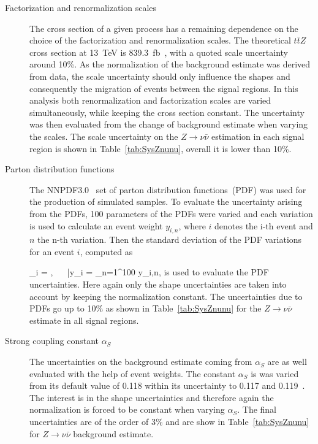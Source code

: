 \begin{description}
\item[Factorization and renormalization scales]
The cross section of a given process has a remaining dependence on the choice of the factorization and renormalization scales. The theoretical $t\bar{t}Z$ cross section at 13~TeV is 839.3~fb~\cite{deFlorian:2016spz}, with a quoted scale uncertainty around 10\%. As the normalization of the background estimate was derived from data, the scale uncertainty should only influence the shapes and consequently the migration of events between the signal regions. In this analysis both renormalization and factorization scales are varied simultaneously, while keeping the cross section constant. The uncertainty was then evaluated from the change of background estimate when varying the scales. The scale uncertainty on the $Z \to \nu \bar{\nu}$ estimation in each signal region is shown in Table~\ref{tab:SysZnunu}, overall it is lower than 10\%.


\item[Parton distribution functions]
The NNPDF3.0~\cite{Ball:2014uwa} set of parton distribution functions~(PDF) was used for the production of simulated samples. To evaluate the uncertainty arising from the PDFs, 100 parameters of the PDFs were varied and each variation is used to calculate an event weight $y_{i,n}$, where $i$ denotes the i-th event and $n$ the n-th variation. Then the standard deviation of the PDF variations for an event $i$, computed as

{
\sigma_{i} = , ~~ \bar{y}_{i} =  \sum_{n=1}^{100} y_{i,n},
}
is used to evaluate the PDF uncertainties. Here again only the shape uncertainties are taken into account by keeping the normalization constant. The uncertainties due to PDFs go up to 10\% as shown in Table~\ref{tab:SysZnunu} for the $Z \to \nu \bar{\nu}$ estimate in all signal regions.

\item[Strong coupling constant $\alpha_{S}$]
The uncertainties on the background estimate coming from $\alpha_{S}$ are as well evaluated with the help of event weights. The constant $\alpha_{S}$ is was varied from its default value of 0.118  within its uncertainty to 0.117 and 0.119~\cite{Patrignani:2016xqp}.  The interest is in the shape uncertainties and therefore again the normalization is forced to be constant when varying $\alpha_{S}$. The final uncertainties are of the order of 3\% and are show in Table~\ref{tab:SysZnunu} for $Z \to \nu \bar{\nu}$ background estimate.
\end{description}

